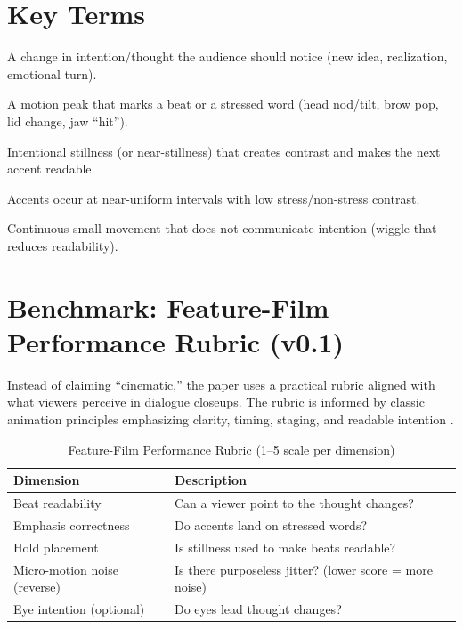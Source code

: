 \documentclass[11pt,a4paper]{article}
\begin{document}
\section{Key Terms}

\begin{description}[leftmargin=1.5em, style=nextline]
    \item[\textbf{Beat}] A change in intention/thought the audience should notice (new idea, realization, emotional turn).
    \item[\textbf{Accent}] A motion peak that marks a beat or a stressed word (head nod/tilt, brow pop, lid change, jaw ``hit'').
    \item[\textbf{Hold}] Intentional stillness (or near-stillness) that creates contrast and makes the next accent readable.
    \item[\textbf{Even timing}] Accents occur at near-uniform intervals with low stress/non-stress contrast.
    \item[\textbf{Micro-motion noise}] Continuous small movement that does not communicate intention (wiggle that reduces readability).
\end{description}

\section{Benchmark: Feature-Film Performance Rubric (v0.1)}

Instead of claiming ``cinematic,'' the paper uses a practical rubric aligned with what viewers perceive in dialogue closeups. The rubric is informed by classic animation principles emphasizing clarity, timing, staging, and readable intention \citep{thomas1995illusion, williams2009animator}.

\begin{table}[H]
\centering
\caption{Feature-Film Performance Rubric (1--5 scale per dimension)}
\label{tab:rubric}
\begin{tabular}{@{}lp{9cm}@{}}
\toprule
\textbf{Dimension} & \textbf{Description} \\
\midrule
Beat readability & Can a viewer point to the thought changes? \\
Emphasis correctness & Do accents land on stressed words? \\
Hold placement & Is stillness used to make beats readable? \\
Micro-motion noise (reverse) & Is there purposeless jitter? (lower score = more noise) \\
Eye intention (optional) & Do eyes lead thought changes? \\
\bottomrule
\end{tabular}
\end{table}
\end{document}

